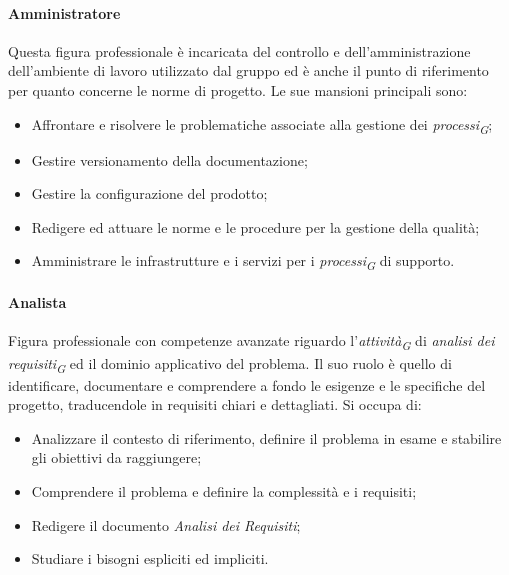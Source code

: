 \paragraph{Amministratore}\label{amministratore}Questa figura professionale è incaricata del controllo e dell'amministrazione dell'ambiente di lavoro utilizzato dal gruppo ed è anche il punto di riferimento per quanto concerne le norme di progetto. Le sue mansioni principali sono:
\begin{itemize}
		\item Affrontare e risolvere le problematiche associate alla gestione dei \textit{processi}\textsubscript{\textit{G}};
		\item Gestire versionamento della documentazione;
		\item Gestire la configurazione del prodotto;
		\item Redigere ed attuare le norme e le procedure per la gestione della qualità;
		\item Amministrare le infrastrutture e i servizi per i \textit{processi}\textsubscript{\textit{G}} di supporto.
\end{itemize}

\paragraph{Analista}\label{analista}Figura professionale con competenze avanzate riguardo l'\textit{attività}\textsubscript{\textit{G}} di \textit{analisi dei requisiti}\textsubscript{\textit{G}} ed il dominio applicativo del problema. Il suo ruolo è quello di identificare, documentare e comprendere a fondo le esigenze e le specifiche del progetto, traducendole in requisiti chiari e dettagliati. Si occupa di:
\begin{itemize}
		\item Analizzare il contesto di riferimento, definire il problema in esame e stabilire gli obiettivi da raggiungere;
		\item Comprendere il problema e definire la complessità e i requisiti;
		\item Redigere il documento \textit{Analisi dei Requisiti};
		\item Studiare i bisogni espliciti ed impliciti.
\end{itemize}

